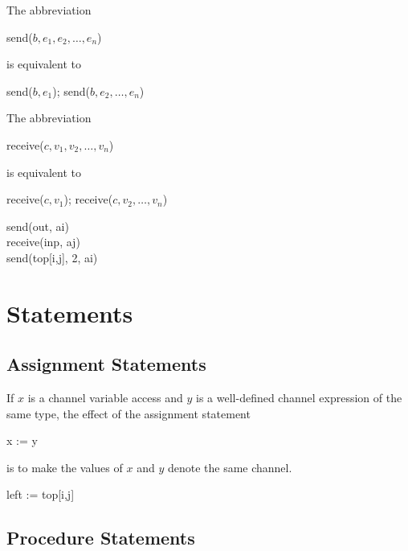 The abbreviation

\begin{center}
  send($b,e_1,e_2,\ldots,e_n$)
\end{center}

\noindent
is equivalent to

\begin{center}
  {\Begin} send($b,e_1$); send($b,e_2,\ldots,e_n$) {\End}
\end{center}

The abbreviation

\begin{center}
  receive($c,v_1,v_2,\ldots,v_n$)
\end{center}

\noindent
is equivalent to

\begin{center}
  {\Begin} receive($c,v_1$); receive($c,v_2,\ldots,v_n$) {\End}
\end{center}

\examples

\begin{program}{8.1em}
  {\PA}send(out, ai)        \\
  {\PA}receive(inp, aj)     \\
  {\PA}send(top[i,j], 2, ai)
\end{program}


\section{Statements}

\subsection{Assignment Statements}

If $x$ is a channel variable access and $y$ is a
well-defined channel expression of the same type, the effect
of the assignment statement

\begin{center}
  x := y
\end{center}

\noindent
is to make the values of $x$ and $y$ denote the same
channel.

\blankline

\example

\begin{center}
  left := top[i,j]
\end{center}


\subsection{Procedure Statements}

